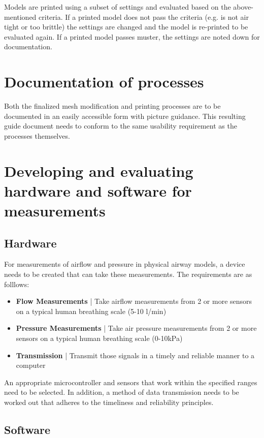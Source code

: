 \documentclass[MME,Projekt,english]{twbook}%
\begin{document}
Models are printed using a subset of settings and evaluated based on the above-mentioned criteria. If a printed model
does not pass the criteria (e.g. is not air tight or too brittle) the settings are changed and the model is re-printed to be evaluated again.
If a printed model passes muster, the settings are noted down for documentation.

\section{Documentation of processes}

Both the finalized mesh modification and printing processes are to be documented in an easily accessible
form with picture guidance. This resulting guide document needs to conform to the same usability requirement
as the processes themselves.

\section{Developing and evaluating hardware and software for measurements}

\subsection{Hardware}

For measurements of airflow and pressure in physical airway models, a device needs to be created
that can take these measurements. The requirements are as folllows:

\begin{itemize}
	\item \textbf{Flow Measurements} | Take airflow measurements from 2 or more sensors on a typical human breathing scale (5-10 l/min)
	\item \textbf{Pressure Measurements} | Take air pressure measurements from 2 or more sensors on a typical human breathing scale (0-10kPa)
	\item \textbf{Transmission} | Transmit those signals in a timely and reliable manner to a computer
\end{itemize}

An appropriate microcontroller and sensors that work within the specified ranges need to be selected.
In addition, a method of data transmission needs to be worked out that adheres to the timeliness and reliability principles.

\subsection{Software}
\end{document}
